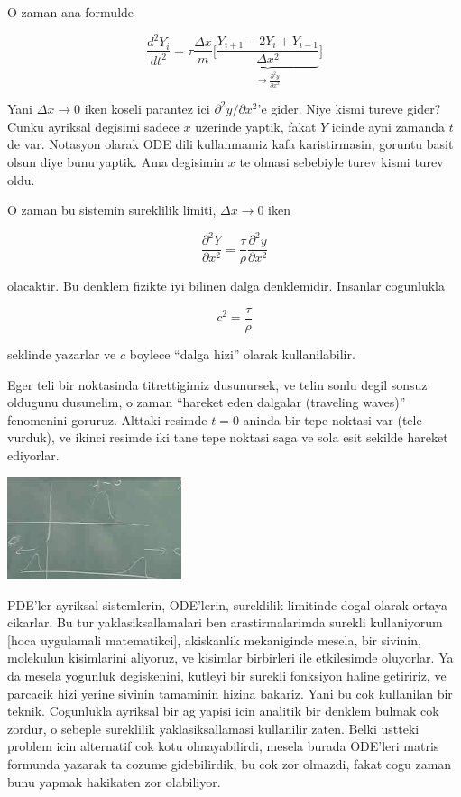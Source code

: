 \documentclass[12pt,fleqn]{article}\usepackage{../common}
\begin{document}
O zaman ana formulde

\[ \frac{d^2Y_i}{dt^2} = 
\tau \frac{\Delta x}{m} \bigg[\underbrace{
\frac{Y_{i+1} - 2Y_i + Y_{i-1}}{\Delta x^2}
}_{\to \frac{\partial ^2y}{\partial x^2}}
\bigg]
\]

Yani $\Delta x \to 0$ iken koseli parantez ici $\partial ^2y/\partial
x^2$'e gider. Niye kismi tureve gider? Cunku ayriksal degisimi sadece $x$
uzerinde yaptik, fakat $Y$ icinde ayni zamanda $t$ de var. Notasyon olarak
ODE dili kullanmamiz kafa karistirmasin, goruntu basit olsun diye bunu
yaptik. Ama degisimin $x$ te olmasi sebebiyle turev kismi turev oldu. 

O zaman bu sistemin sureklilik limiti, $\Delta x \to 0$ iken

\[ 
\frac{\partial ^2Y}{\partial x^2} = 
\frac{\tau}{\rho}\frac{\partial ^2y}{\partial x^2}
 \]

olacaktir. Bu denklem fizikte iyi bilinen dalga denklemidir. Insanlar
cogunlukla 

\[ c^2 = \frac{\tau}{\rho} \]

seklinde yazarlar ve $c$ boylece ``dalga hizi'' olarak kullanilabilir. 

Eger teli bir noktasinda titrettigimiz dusunursek, ve telin sonlu degil
sonsuz oldugunu dusunelim, o zaman ``hareket eden dalgalar (traveling
waves)'' fenomenini goruruz. Alttaki resimde $t=0$ aninda bir tepe noktasi
var (tele vurduk), ve ikinci resimde iki tane tepe noktasi saga ve sola
esit sekilde hareket ediyorlar. 

\includegraphics[height=3cm]{1_10.png}

PDE'ler ayriksal sistemlerin, ODE'lerin, sureklilik limitinde dogal olarak
ortaya cikarlar. Bu tur yaklasiksallamalari ben arastirmalarimda surekli
kullaniyorum [hoca uygulamali matematikci], akiskanlik mekaniginde mesela,
bir sivinin, molekulun kisimlarini aliyoruz, ve kisimlar birbirleri ile
etkilesimde oluyorlar. Ya da mesela yogunluk degiskenini, kutleyi bir
surekli fonksiyon haline getiririz, ve parcacik hizi yerine sivinin
tamaminin hizina bakariz. Yani bu cok kullanilan bir teknik. Cogunlukla
ayriksal bir ag yapisi icin analitik bir denklem bulmak cok zordur, o
sebeple sureklilik yaklasiksallamasi kullanilir zaten. Belki ustteki
problem icin alternatif cok kotu olmayabilirdi, mesela burada ODE'leri
matris formunda yazarak ta cozume gidebilirdik, bu cok zor olmazdi, fakat
cogu zaman bunu yapmak hakikaten zor olabiliyor.
\end{document}
